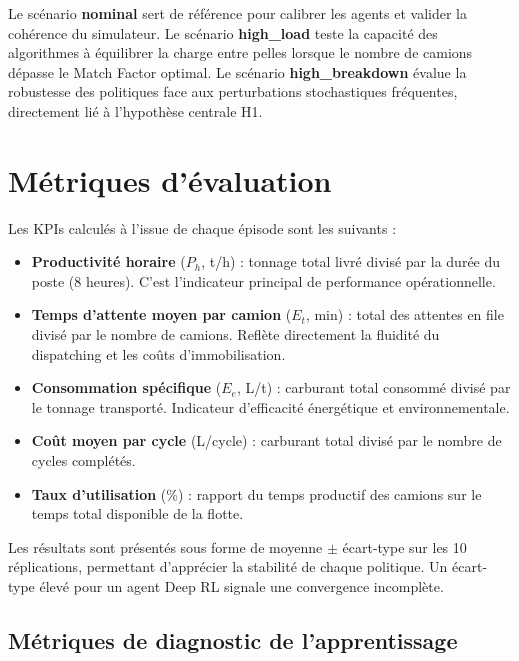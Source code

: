 \documentclass[11pt,a4paper]{report}
\begin{document}
Le scénario \textbf{nominal} sert de référence pour calibrer les agents et valider la cohérence du simulateur.  Le scénario \textbf{high\_load} teste la capacité des algorithmes à équilibrer la charge entre pelles lorsque le nombre de camions dépasse le Match Factor optimal.  Le scénario \textbf{high\_breakdown} évalue la robustesse des politiques face aux perturbations stochastiques fréquentes, directement lié à l'hypothèse centrale H1.

\section{Métriques d'évaluation}
\label{sec:metriques}

Les KPIs calculés à l'issue de chaque épisode sont les suivants :

\begin{itemize}
    \item \textbf{Productivité horaire} ($P_h$, t/h) : tonnage total livré divisé par la durée du poste (8 heures).  C'est l'indicateur principal de performance opérationnelle.
    
    \item \textbf{Temps d'attente moyen par camion} ($E_t$, min) : total des attentes en file divisé par le nombre de camions.  Reflète directement la fluidité du dispatching et les coûts d'immobilisation.
    
    \item \textbf{Consommation spécifique} ($E_e$, L/t) : carburant total consommé divisé par le tonnage transporté.  Indicateur d'efficacité énergétique et environnementale.
    
    \item \textbf{Coût moyen par cycle} (L/cycle) : carburant total divisé par le nombre de cycles complétés.
    
    \item \textbf{Taux d'utilisation} (\%) : rapport du temps productif des camions sur le temps total disponible de la flotte.
\end{itemize}

Les résultats sont présentés sous forme de moyenne $\pm$ écart-type sur les 10 réplications, permettant d'apprécier la stabilité de chaque politique. Un écart-type élevé pour un agent Deep RL signale une convergence incomplète.

\subsection{Métriques de diagnostic de l'apprentissage}
\label{sec:metriques-rl}
\end{document}
